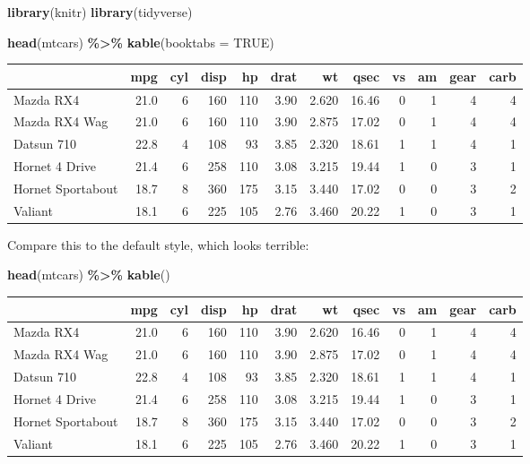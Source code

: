 \documentclass[a4paper, twoside]{templates/ociamthesis}
\newenvironment{Shaded}{\begin{snugshade}}{\end{snugshade}}
\newcommand{\DataTypeTok}[1]{\textcolor[rgb]{0.13,0.29,0.53}{#1}}
\newcommand{\KeywordTok}[1]{\textcolor[rgb]{0.13,0.29,0.53}{\textbf{#1}}}
\newcommand{\NormalTok}[1]{#1}
\newcommand{\OperatorTok}[1]{\textcolor[rgb]{0.81,0.36,0.00}{\textbf{#1}}}
\newcommand{\OtherTok}[1]{\textcolor[rgb]{0.56,0.35,0.01}{#1}}
\newcommand{\StringTok}[1]{\textcolor[rgb]{0.31,0.60,0.02}{#1}}
\renewenvironment{Shaded}
{
  \vspace{10pt}%
  \begin{snugshade}%
}{%
  \end{snugshade}%
  \vspace{8pt}%
}
\theoremstyle{definition}
\theoremstyle{definition}
\theoremstyle{definition}
\theoremstyle{definition}
\theoremstyle{remark}
\begin{document}
\begin{Shaded}
\begin{Highlighting}[]
\KeywordTok{library}\NormalTok{(knitr)}
\KeywordTok{library}\NormalTok{(tidyverse)}

\KeywordTok{head}\NormalTok{(mtcars) }\OperatorTok{\%\textgreater{}\%}\StringTok{ }
\StringTok{  }\KeywordTok{kable}\NormalTok{(}\DataTypeTok{booktabs =} \OtherTok{TRUE}\NormalTok{)}
\end{Highlighting}
\end{Shaded}

\begin{tabular}{lrrrrrrrrrrr}
\toprule
  & mpg & cyl & disp & hp & drat & wt & qsec & vs & am & gear & carb\\
\midrule
Mazda RX4 & 21.0 & 6 & 160 & 110 & 3.90 & 2.620 & 16.46 & 0 & 1 & 4 & 4\\
Mazda RX4 Wag & 21.0 & 6 & 160 & 110 & 3.90 & 2.875 & 17.02 & 0 & 1 & 4 & 4\\
Datsun 710 & 22.8 & 4 & 108 & 93 & 3.85 & 2.320 & 18.61 & 1 & 1 & 4 & 1\\
Hornet 4 Drive & 21.4 & 6 & 258 & 110 & 3.08 & 3.215 & 19.44 & 1 & 0 & 3 & 1\\
Hornet Sportabout & 18.7 & 8 & 360 & 175 & 3.15 & 3.440 & 17.02 & 0 & 0 & 3 & 2\\
\addlinespace
Valiant & 18.1 & 6 & 225 & 105 & 2.76 & 3.460 & 20.22 & 1 & 0 & 3 & 1\\
\bottomrule
\end{tabular}

\vspace{4mm}

Compare this to the default style, which looks terrible:

\begin{Shaded}
\begin{Highlighting}[]
\KeywordTok{head}\NormalTok{(mtcars) }\OperatorTok{\%\textgreater{}\%}\StringTok{ }
\StringTok{  }\KeywordTok{kable}\NormalTok{()}
\end{Highlighting}
\end{Shaded}

\begin{tabular}{l|r|r|r|r|r|r|r|r|r|r|r}
\hline
  & mpg & cyl & disp & hp & drat & wt & qsec & vs & am & gear & carb\\
\hline
Mazda RX4 & 21.0 & 6 & 160 & 110 & 3.90 & 2.620 & 16.46 & 0 & 1 & 4 & 4\\
\hline
Mazda RX4 Wag & 21.0 & 6 & 160 & 110 & 3.90 & 2.875 & 17.02 & 0 & 1 & 4 & 4\\
\hline
Datsun 710 & 22.8 & 4 & 108 & 93 & 3.85 & 2.320 & 18.61 & 1 & 1 & 4 & 1\\
\hline
Hornet 4 Drive & 21.4 & 6 & 258 & 110 & 3.08 & 3.215 & 19.44 & 1 & 0 & 3 & 1\\
\hline
Hornet Sportabout & 18.7 & 8 & 360 & 175 & 3.15 & 3.440 & 17.02 & 0 & 0 & 3 & 2\\
\hline
Valiant & 18.1 & 6 & 225 & 105 & 2.76 & 3.460 & 20.22 & 1 & 0 & 3 & 1\\
\hline
\end{tabular}
\end{document}
